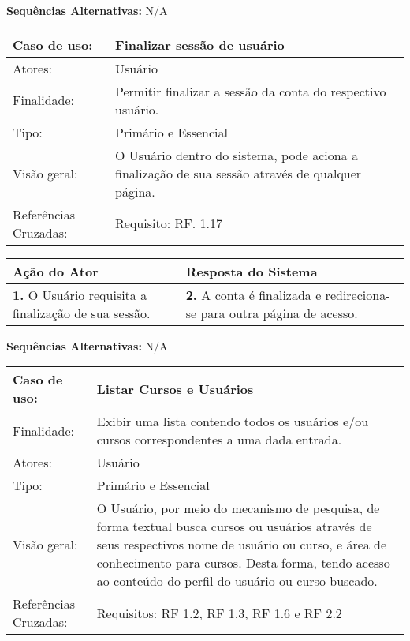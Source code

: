 \documentclass[12pt,a4paper,onecolumn,titlepage]{article}
\begin{document}
\textbf{Sequências Alternativas:} N/A

\newpage

\begin{table}[h!]
\begin{center}
\begin{tabular}{p{2.5cm} p{9.5cm}}
Caso de uso: & \textbf{Finalizar sessão de usuário} \\ \hline
Atores: & Usuário \\ \hline
Finalidade: & Permitir finalizar a sessão da conta do respectivo usuário. \\ \hline
Tipo: & Primário e Essencial \\ \hline
Visão geral: & O Usuário dentro do sistema, pode aciona a finalização de sua sessão através de qualquer página. \\ \hline
Referências Cruzadas: & Requisito: RF. 1.17

\end{tabular}
\end{center}
\end{table}

\begin{center}
\def\arraystretch{1.1}
\begin{tabular}{|p{6cm}|p{6cm}|}

\hline
\textbf{Ação do Ator} & \textbf{Resposta do Sistema} \\ \hline
\textbf{1.} O Usuário requisita a finalização de sua sessão. & \textbf{2.} A conta é finalizada e redireciona-se para outra página de acesso. \\ \hline
\end{tabular}
\end{center}

\textbf{Sequências Alternativas:} N/A

\newpage


\begin{table}[h!]
\begin{center}
\begin{tabular}{p{2.5cm} p{9.5cm}}
Caso de uso: & \textbf{Listar Cursos e Usuários} \\ \hline
Finalidade: & Exibir uma lista contendo todos os usuários e/ou cursos correspondentes a uma dada entrada.\\ \hline
Atores: & Usuário \\ \hline
Tipo: & Primário e Essencial\\ \hline
Visão geral: & O Usuário, por meio do mecanismo de pesquisa, de forma textual busca cursos ou usuários através de seus respectivos nome de usuário ou curso, e área de conhecimento para cursos. Desta forma, tendo acesso ao conteúdo do perfil do usuário ou curso buscado.\\ \hline
Referências Cruzadas: & Requisitos: RF 1.2, RF 1.3, RF 1.6 e RF 2.2

\end{tabular}
\end{center}
\end{table}
\end{document}
